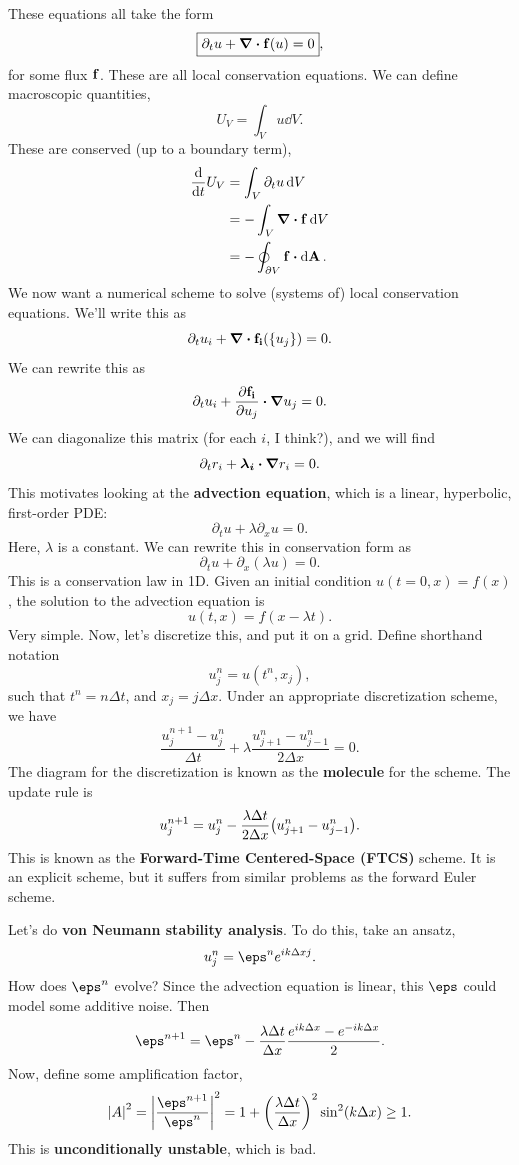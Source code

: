 \documentclass[12pt,letterpaper]{article}
\begin{document}
These equations all take the form
\[\boxed{\partial_tu+\div{\vb{f}(u)}=0},\]
for some flux $\vb{f}$. These are all local conservation equations. We can define macroscopic quantities,
\[U_V=\int_Vu\dd{V}.\]
These are conserved (up to a boundary term),
\begin{align*}
    \dv{t}U_V&=\int_V\partial_tu\dd{V}\\
    &=-\int_V\div{\vb f}\dd{V}\\
    &=-\oint_{\partial V}\vb f\vdot\dd{\vb{A}}.
\end{align*}
We now want a numerical scheme to solve (systems of) local conservation equations. We'll write this as
\[\partial_tu_i+\div{\vb{f_i}(\qty{u_j})}=0.\]
We can rewrite this as
\[\partial_tu_i+\pdv{\vb{f_i}}{u_j}\vdot\grad u_j=0.\]
We can diagonalize this matrix (for each $i$, I think?), and we will find
\[\partial_tr_i+\boldsymbol{\lambda_i}\vdot\grad r_i=0.\]
This motivates looking at the \textbf{advection equation}, which is a linear, hyperbolic, first-order PDE:
\[\boxed{\partial_tu+\lambda\partial_xu=0}.\]
Here, $\lambda$ is a constant. We can rewrite this in conservation form as
\[\partial_tu+\partial_x(\lambda u)=0.\]
This is a conservation law in 1D. Given an initial condition $u(t=0,x)=f(x)$, the solution to the advection equation is
\[u(t,x)=f(x-\lambda t).\]
Very simple. Now, let's discretize this, and put it on a grid. Define shorthand notation
\[u_j^n=u(t^n,x_j),\]
such that $t^n=n\Delta t$, and $x_j=j\Delta x$. Under an appropriate discretization scheme, we have
\[\frac{u^{n+1}_j-u^n_j}{\Delta t}+\lambda\frac{u^n_{j+1}-u^n_{j-1}}{2\Delta x}=0.\]
The diagram for the discretization is known as the \textbf{molecule} for the scheme. The update rule is
\[u_j^{n+1}=u_j^n-\frac{\lambda\Delta t}{2\Delta x}\qty(u_{j+1}^n-u_{j-1}^n).\]
This is known as the \textbf{Forward-Time Centered-Space (FTCS)} scheme. It is an explicit scheme, but it suffers from similar problems as the forward Euler scheme.

Let's do \textbf{von Neumann stability analysis}. To do this, take an ansatz,
\[u_j^n=\eps^ne^{ik\Delta xj}.\]
How does $\eps^n$ evolve? Since the advection equation is linear, this $\eps$ could model some additive noise. Then
\[\eps^{n+1}=\eps^n-\frac{\lambda\Delta t}{\Delta x}\frac{e^{ik\Delta x}-e^{-ik\Delta x}}{2}.\]
Now, define some amplification factor,
\[\abs{A}^2=\abs{\frac{\eps^{n+1}}{\eps^n}}^2=1+\qty(\frac{\lambda\Delta t}{\Delta x})^2\sin^2(k\Delta x)\geq1.\]
This is \textbf{unconditionally unstable}, which is bad.
\end{document}

